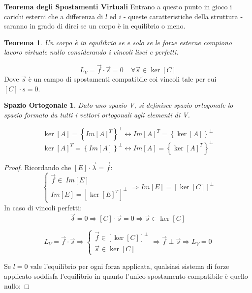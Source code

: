 \documentclass{article}
\begin{document}
\begin{adjustwidth}{2in}{}
{\Large \textbf{Teorema degli Spostamenti Virtuali}} \mbox{} \newline
Entrano a questo punto in gioco i carichi esterni che a differenza di $l$ ed $i$ - queste caratteristiche della struttura - saranno in grado di dirci se un corpo è in equilibrio o meno. \newline

\newtheorem*{thm}{Teorema}

\begin{thm}
	Un corpo è in equilibrio se e solo se le forze esterne compiono lavoro virtuale nullo considerando i vincoli lisci e perfetti.
\end{thm} 

\[
L_V = \vec{f} \cdot \vec{s} = 0 ~~~~~ \forall \vec{s} \in \ker[C]
\]
Dove $ \vec{s} $ è un campo di spostamenti compatibile coi vincoli tale per cui $[C]\cdot s = 0$. \newline 

\newtheorem*{defn}{Spazio Ortogonale}

\begin{defn}
	Dato uno spazio V, si definisce spazio ortogonale lo spazio formato da tutti i vettori ortogonali agli elementi di V.
\end{defn} 

\[
\ker[A] = \left\lbrace Im[A]^T \right\rbrace^{\perp}  \leftrightarrow Im[A]^T =\left\lbrace \ker[A]\right\rbrace ^{\perp}
\]
\[
\ker[A]^T = \left\lbrace Im[A] \right\rbrace^{\perp}  \leftrightarrow Im[A] =\left\lbrace \ker[A]^T\right\rbrace ^{\perp}
\]

\begin{proof}
	Ricordando che \([E]\cdot\vec{\lambda} = \vec{f}\):
	\[
	\begin{cases}
		\vec{f} \in ~ Im[E] \\
		Im[E] = [\ker[E]^T]^{\perp}
	\end{cases} \Rightarrow Im[E] = [\ker[C]]^{\perp}
	\]
	In caso di vincoli perfetti:
	\[\vec{\delta} = 0 \Rightarrow [C]\cdot \vec{s} = 0 \Rightarrow \vec{s}\in \ker[C]\]
	
	\[
	L_V = \vec{f} \cdot \vec{s} \Rightarrow \begin{cases}
		\vec{f} \in [\ker[C]]^{\perp}\\
		\vec{s} \in \ker[C]
	\end{cases} \Rightarrow \vec{f} \perp \vec{s} \Rightarrow L_V = 0 \]

 
Se $l =0$ vale l'equilibrio per ogni forza applicata, qualsiasi sistema di forze applicato soddisfa l'equilibrio in quanto l'unico spostamento compatibile è quello nullo: 


\end{proof}
\end{adjustwidth}
\end{document}
